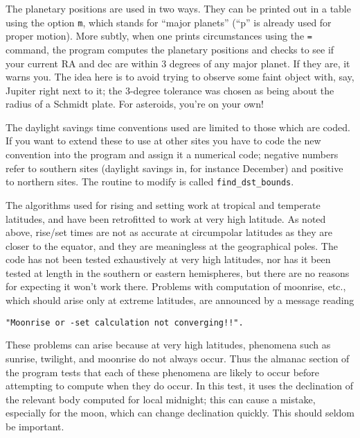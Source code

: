 The planetary positions are used in two ways.  They can be printed out in a 
table using the option {\tt m}, which stands for ``major planets'' 
(``p'' is already used for proper motion).  More subtly, when one prints
circumstances using the {\tt =} command, the program computes the planetary 
positions and checks to see if your current RA and dec are within 3 degrees 
of any major planet.  If they are, it warns you.  The idea here is to avoid 
trying to observe some faint object with, say, Jupiter right next to it; 
the 3-degree tolerance was chosen as being about the radius of a Schmidt 
plate.  For asteroids, you're on your own!
\par
{}
\par
The daylight savings time conventions used are limited to those
which are coded. If you want to extend these to use at other sites 
you have to
code the new convention into the program and assign it a numerical code; 
negative numbers refer to southern
sites (daylight savings in, for instance December) and positive
to northern sites.  The routine to modify is called {\tt find\_dst\_bounds}.
\par
The algorithms used for rising and setting work at tropical
and temperate latitudes, and have been retrofitted to work
at very high latitude.  As noted above, rise/set times
are not as accurate at circumpolar latitudes as they are closer
to the equator, and they are meaningless at the geographical poles.  
The code has not been tested exhaustively at very high latitudes, nor has 
it been tested at length in the southern or eastern hemispheres, but there 
are no reasons for expecting it won't work there.  Problems with computation of
moonrise, etc., which should arise only at extreme latitudes,
are announced by a message reading 
\par
{\tt \qquad "Moonrise or -set calculation not converging!!".}
\par
These problems can arise because at very high latitudes, 
phenomena such as sunrise, twilight, and moonrise
do not always occur.  Thus the almanac section of the program tests
that each of these phenomena are likely to occur before 
attempting to compute when they do occur.  In this test,
it uses the declination of the relevant body computed for local
midnight; this can cause a mistake, especially
for the moon, which can change declination quickly.  This should
seldom be important.
\par
{}
\par

